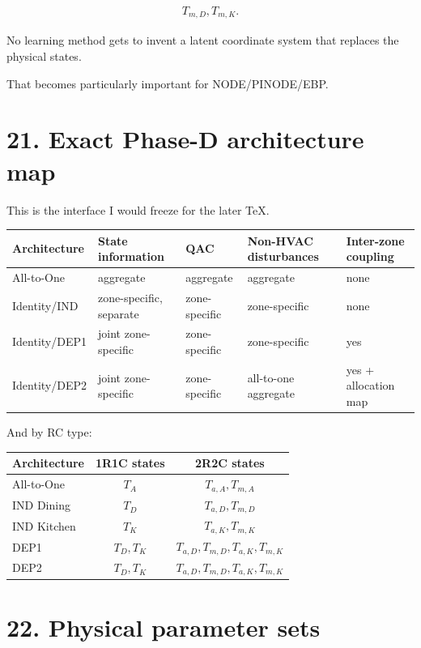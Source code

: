 \documentclass[11pt]{article}
\begin{document}
\begin{align}
T_{m,D},T_{m,K}.
\end{align}

No learning method gets to invent a latent coordinate system that replaces the physical states.

That becomes particularly important for NODE/PINODE/EBP.

\section*{21. Exact Phase-D architecture map}

This is the interface I would freeze for the later TeX.

\begin{center}
\begin{tabular}{|l|l|l|l|l|}
\hline
Architecture & State information & QAC & Non-HVAC disturbances & Inter-zone coupling\\
\hline
All-to-One & aggregate & aggregate & aggregate & none\\
Identity/IND & zone-specific, separate & zone-specific & zone-specific & none\\
Identity/DEP1 & joint zone-specific & zone-specific & zone-specific & yes\\
Identity/DEP2 & joint zone-specific & zone-specific & all-to-one aggregate & yes + allocation map\\
\hline
\end{tabular}
\end{center}

And by RC type:

\begin{center}
\begin{tabular}{|l|c|c|}
\hline
Architecture & 1R1C states & 2R2C states\\
\hline
All-to-One & \(T_A\) & \(T_{a,A},T_{m,A}\)\\
IND Dining & \(T_D\) & \(T_{a,D},T_{m,D}\)\\
IND Kitchen & \(T_K\) & \(T_{a,K},T_{m,K}\)\\
DEP1 & \(T_D,T_K\) & \(T_{a,D},T_{m,D},T_{a,K},T_{m,K}\)\\
DEP2 & \(T_D,T_K\) & \(T_{a,D},T_{m,D},T_{a,K},T_{m,K}\)\\
\hline
\end{tabular}
\end{center}

\section*{22. Physical parameter sets}
\end{document}
